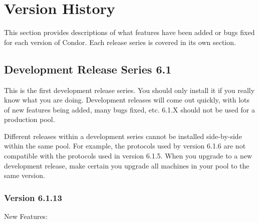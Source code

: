 \section{\label{sec:Version-History}Version History}

This section provides descriptions of what features have been added or
bugs fixed for each version of Condor.  
Each release series is covered in its own section.

\subsection{\label{sec:History-6-1}Development Release Series 6.1}

This is the first development release series.
You should only install it if you really know what you are doing.
Development releases will come out quickly, with lots of new features
being added, many bugs fixed, etc.  
6.1.X should not be used for a production pool.

\Note Different releases within a development series cannot be
installed side-by-side within the same pool. 
For example, the protocols used by version 6.1.6 are not compatible with the
protocols used in version 6.1.5.  
When you upgrade to a new development release, make certain you upgrade all
machines in your pool to the same version.

\subsubsection{\label{sec:New-6-1-13}Version 6.1.13}

\noindent New Features:

